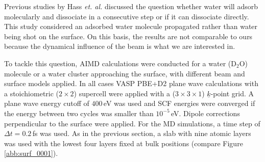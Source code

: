 \documentclass[11pt,DIV=13,BCOR=5mm,a4paper,headinclude]{scrbook}
\renewcommand{\vec}[1]{\underline{#1}}
\begin{document}
Previous studies by Hass \textit{et. al.}\cite{hass98,hass00} discussed the question whether water will adsorb molecularly and dissociate in a consecutive step or if it can dissociate directly.
This study considered an adsorbed water molecule propagated rather than water being shot on the surface.
On this basis, the results are not comparable to ours because the dynamical influence of the beam is what we are interested in.


To tackle this question, AIMD calculations were conducted for a water (D$_2$O) molecule or a water cluster approaching the surface, with different beam and surface models applied.
In all cases VASP PBE+D2 plane wave calculations with a stoichiometric ($2\times 2$) supercell were applied with a ($3\times 3 \times 1$) $\vec{k}$-point grid.
A plane wave energy cutoff of $400\,$eV was used and SCF energies were converged if the energy between two cycles was smaller than $10^{-5}\,$eV.
Dipole corrections perpendicular to the surface were applied.
For the MD simulations, a time step of $\Delta t=0.2\,$fs was used.
As in the previous section, a slab with nine atomic layers was used with the lowest four layers fixed at bulk positions (compare Figure \ref{abb:surf_0001}).
\end{document}
